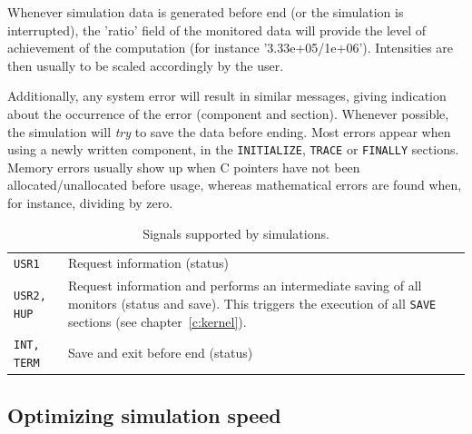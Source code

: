 Whenever simulation data is generated before end (or the simulation is
interrupted), the 'ratio' field of the monitored data will provide the level of
achievement of the computation (for instance '3.33e+05/1e+06'). Intensities are
then usually to be scaled accordingly by the user.

Additionally, any system error will result in similar messages, giving
indication about the occurrence of the error (component and section). Whenever
possible, the simulation will {\em try} to save the data before ending. Most
errors appear when using a newly written component, in the \texttt{INITIALIZE},
\texttt{TRACE} or \texttt{FINALLY} sections. Memory errors usually show up when
C pointers have not been allocated/unallocated before usage, whereas
mathematical errors are found when, for instance, dividing by zero.

\begin{table}
  \begin{center}
    {\let\my=\\
    \begin{tabular}{|p{}|p{}|}
      \hline
      \texttt{USR1} & Request information (status)  \\
      \texttt{USR2, HUP} & Request information and performs an intermediate
      saving of all monitors (status and save). This triggers the execution of
      all \texttt{SAVE} sections (see chapter~\ref{c:kernel}).  \\
      \texttt{INT, TERM} & Save and exit before end (status)  \\
      \hline
    \end{tabular}
    \caption{Signals supported by \MCS simulations.}
    \label{t:signals}
    }
  \end{center}
\end{table}

\subsection{Optimizing simulation speed}
\label{s:optim}

